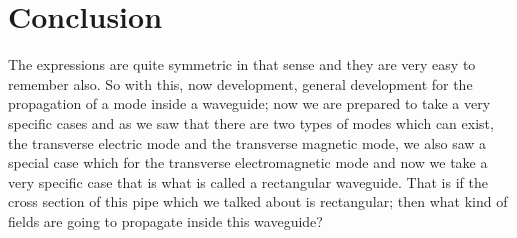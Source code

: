 \section{Conclusion}
The expressions are quite symmetric in that sense and they are very easy to remember also. So with this, now development, general development for the propagation of a mode inside a waveguide; now we are prepared to take a very specific cases and as we saw that there are two types of modes which can exist, the transverse electric mode and the transverse magnetic mode, we also saw a special case which for the transverse electromagnetic mode and now we take a very specific case that is what is called a rectangular waveguide. That is if the cross section of this pipe which we talked about is rectangular; then what kind of fields are going to propagate inside this waveguide?